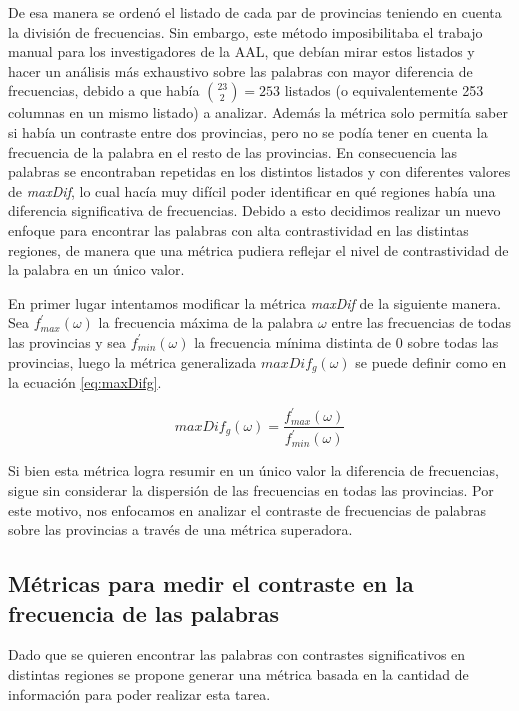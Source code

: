 De esa manera se ordenó el listado de cada par de provincias teniendo en cuenta la división de frecuencias. 
Sin embargo, este método imposibilitaba el trabajo manual para los investigadores de la AAL, que debían mirar estos listados y hacer un análisis más exhaustivo sobre las palabras con mayor diferencia de frecuencias, debido a que había $\binom{23}{2} = 253$
listados (o equivalentemente 253 columnas en un mismo listado) a analizar. Además la métrica solo permitía saber si había un contraste entre dos provincias, pero no se podía tener en cuenta la frecuencia de la palabra en el resto de las provincias. 
En consecuencia las palabras se encontraban repetidas en los distintos listados y con diferentes valores de \textit{maxDif}, lo cual hacía muy difícil poder identificar en qué regiones había una diferencia significativa de frecuencias.
Debido a esto decidimos realizar un nuevo enfoque para encontrar las palabras con alta contrastividad en las distintas regiones, de manera que una métrica pudiera reflejar el nivel de contrastividad de la palabra en un único valor. 

En primer lugar intentamos modificar la métrica \textit{maxDif} de la siguiente manera. 
Sea $f_{max}^\prime(\omega)$ la frecuencia máxima de la palabra $\omega$ entre las frecuencias de todas las provincias y sea $f_{min}^\prime(\omega)$ la frecuencia mínima distinta de $0$ sobre todas las provincias, luego la métrica generalizada \textit{$maxDif_g(\omega)$} se puede definir como en la ecuación \ref{eq:maxDifg}.

\begin{equation}
 maxDif_g(\omega) = \frac{f_{max}^\prime(\omega)}{f_{min}^\prime(\omega)}
 \label{eq:maxDifg}  
\end{equation} 

Si bien esta métrica logra resumir en un único valor la diferencia de frecuencias, sigue sin considerar la dispersión de las frecuencias en todas las provincias.
Por este motivo, nos enfocamos en analizar el contraste de frecuencias de palabras sobre las provincias a través de una métrica superadora.

\subsection{Métricas para medir el contraste en la frecuencia de las palabras}
Dado que se quieren encontrar las palabras con contrastes significativos en distintas 
regiones se propone generar una métrica basada en la cantidad de información 
para poder realizar esta tarea.

